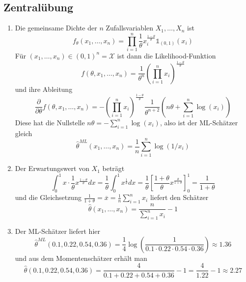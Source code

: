 \documentclass[a4paper]{article}
\begin{document}
\makeexheader

\subsection{Zentralübung}

\begin{enumerate}
    \item Die gemeinsame Dichte der $n$ Zufallsvariablen $X_1, \dots, X_n$ ist
    \begin{equation*}
        f_\theta(x_1, \dots, x_n) =  \prod_{i = 1}^n \frac{1}{\theta} x_i^{\frac{1 - \theta}{\theta}} \mathds{1}_{(0,1)}(x_i)
    \end{equation*}
    Für $(x_1, \dots, x_n) \in (0,1)^n = \mathcal{X}$ ist dann die Likelihood-Funktion
    \begin{equation*}
        f(\theta, x_1, \dots, x_n) = \frac{1}{\theta^n} \left(\prod_{i = 1}^n x_i\right)^{\frac{1-\theta}{\theta}}
    \end{equation*}
    und ihre Ableitung
    \begin{equation*}
        \frac{\partial}{\partial \theta} f(\theta, x_1, \dots, x_n) = - \left(\prod_{i = 1}^n x_i\right)^{\frac{1-\theta}{\theta}} \frac{1}{\theta^{n+2}} \left( n \theta + \sum_{i = 1}^{n} \log(x_i) \right)
    \end{equation*}
    Diese hat die Nullstelle $n \theta = - \sum_{i = 1}^{n} \log(x_i)$, also ist der ML-Schätzer gleich
    \begin{equation*}
        \hat{\theta}^{ML}(x_1, \dots, x_n) = \frac{1}{n} \sum_{i = 1}^{n} \log(1/x_i)
    \end{equation*}
    \item Der Erwartungswert von $X_1$ beträgt
    \begin{equation*}
        \int_0^1 x \cdot \frac{1}{\theta} x^{\frac{1 - \theta}{\theta}} dx = \frac{1}{\theta} \int_{0}^{1}  x^{\frac{1}{\theta}} dx = \frac{1}{\theta} \left[ \frac{1+\theta}{\theta} x^{\frac{\theta}{1+\theta}} \right]_0^1 = \frac{1}{1 + \theta} 
    \end{equation*}
    und die Gleichsetzung $\frac{1}{1 + \theta} = \overline{x} = \frac{1}{n} \sum_{i =1}^{n} x_i$ liefert den Schätzer 
    \begin{equation*}
        \hat{\theta}(x_1, \dots, x_n) = \frac{n}{\sum_{i = 1}^{n} x_i} - 1
    \end{equation*}
    \item Der ML-Schätzer liefert hier
    \begin{equation*}
        \hat{\theta}^{ML}(0.1, 0.22, 0.54, 0.36) = \frac{1}{4} \log\left(\frac{1}{0.1 \cdot 0.22 \cdot 0.54 \cdot 0.36}\right) \approx 1.36
    \end{equation*}
    und aus dem Momentenschätzer erhält man
    \begin{equation*}
        \hat{\theta}(0.1, 0.22, 0.54, 0.36) = \frac{4}{0.1 + 0.22 + 0.54 + 0.36} -1 = \frac{4}{1.22} - 1 \approx 2.27
    \end{equation*}
\end{enumerate}
\end{document}
